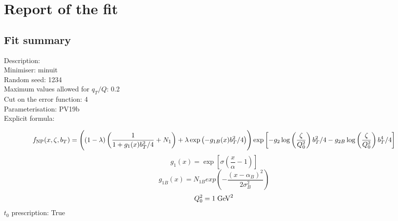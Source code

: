 \documentclass[
]{article}
\date{}
\begin{document}
\hypertarget{report-of-the-fit}{%
\section{Report of the fit}\label{report-of-the-fit}}

\hypertarget{fit-summary}{%
\subsection{Fit summary}\label{fit-summary}}

Description:\\
Minimiser: minuit\\
Random seed: 1234\\
Maximum values allowed for \(q_T / Q\): 0.2\\
Cut on the error function: 4\\
Parameterisation: PV19b\\
Explicit formula:

\[f_{\rm NP}(x,\zeta, b_T)= \Biggl((1-\lambda)
\left(\frac{1}{1 + g_1(x) b_T^2/4}+N_1\right) + \lambda \exp \left(-g_{1B}(x) b_T^2 /4 \right)\Biggr) \exp\left[- g_2 \log\left(\frac{\zeta}{Q_0^2}\right) b_T^2/4 - g_{2B} \log\left(\frac{\zeta}{Q_0^2}\right) b_T^4/4 \right]\]\[g_1(x) = \exp\left[\sigma\left(\frac{x}{\alpha}-1\right)\right]\]\[g_{1B}(x) = N_{1B} exp\left(-\frac{(x-\alpha_B)^2}{2\sigma_B^2}\right)\]\[Q_0^2 = 1\;{\rm GeV}^2\]
\(t_0\) prescription: True
\end{document}

